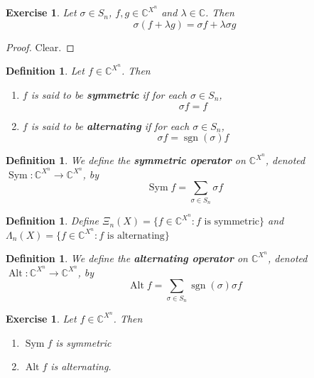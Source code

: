 \documentclass[12pt]{amsart}
\newtheorem{defn}[thm]{Definition}
\newtheorem{ex}[thm]{Exercise}
\newcommand{\lam}{\lambda}
\newcommand{\Lam}{\Lambda}
\newcommand{\sig}{\sigma}
\newcommand{\C}{\mathbb{C}}
\DeclareMathOperator{\alt}{Alt}
\DeclareMathOperator{\sym}{Sym}
\DeclareMathOperator{\sgn}{sgn}
\begin{document}
\begin{ex}
	Let $\sig \in S_n$, $f,g \in \C^{X^n}$ and $\lam \in \C$. Then 
	$$\sig(f+ \lam g) = \sig f + \lam \sig g$$
\end{ex}

\begin{proof}
	Clear.
\end{proof}

\begin{defn}
	Let $f \in \C^{X^n}$. Then 
	\begin{enumerate}
		\item $f$ is said to be \textbf{symmetric} if for each $\sig \in S_n$, $$\sig f = f$$ 
		\item $f$ is said to be \textbf{alternating} if for each $\sig \in S_n$, $$\sig f = \sgn(\sig) f$$
	\end{enumerate}
\end{defn}

\begin{defn}
	We define the \textbf{symmetric  operator} on $\C^{X^n}$, denoted $\sym: \C^{X^n} \rightarrow \C^{X^n}$, by $$\sym f = \sum_{\sig \in S_n}  \sig f$$
\end{defn}

\begin{defn}
	Define $\Xi_n(X) = \{f \in \C^{X^n}: f \text{ is symmetric}\}$ and $\Lam_n(X) = \{f \in \C^{X^n}: f \text{ is alternating}\}$ 
\end{defn}

\begin{defn}
	We define the \textbf{alternating operator} on $\C^{X^n}$, denoted $\alt: \C^{X^n} \rightarrow \C^{X^n}$, by $$\alt f = \sum_{\sig \in S_n}\sgn(\sig)  \sig f$$
\end{defn}

\begin{ex}
	Let $f \in \C^{X^n}$. Then 
	\begin{enumerate}
		\item $\sym f$ is symmetric 
		\item $\alt f$ is alternating.
	\end{enumerate}
\end{ex}
\end{document}
